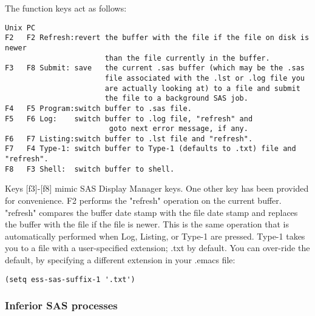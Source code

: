 \documentclass{article}
\begin{document}

The function keys act as follows:
\begin{verbatim}
Unix PC
F2   F2 Refresh:revert the buffer with the file if the file on disk is newer
                       than the file currently in the buffer.
F3   F8 Submit: save   the current .sas buffer (which may be the .sas
                       file associated with the .lst or .log file you
                       are actually looking at) to a file and submit
                       the file to a background SAS job.
F4   F5 Program:switch buffer to .sas file.
F5   F6 Log:    switch buffer to .log file, "refresh" and 
                        goto next error message, if any.
F6   F7 Listing:switch buffer to .lst file and "refresh".
F7   F4 Type-1: switch buffer to Type-1 (defaults to .txt) file and "refresh".
F8   F3 Shell:  switch buffer to shell.
\end{verbatim}

Keys [f3]-[f8] mimic SAS Display Manager keys.  One other key has been
provided for convenience.  F2 performs the "refresh" operation on the
current buffer.  "refresh" compares the buffer date stamp with the
file date stamp and replaces the buffer with the file if the file is
newer.  This is the same operation that is automatically performed
when Log, Listing, or Type-1 are pressed.  Type-1 takes you to a file
with a user-specified extension; .txt by default.  You can over-ride
the default, by specifying a different extension in your .emacs file:
\begin{verbatim}
(setq ess-sas-suffix-1 '.txt')
\end{verbatim}

\subsubsection{Inferior SAS processes}
\label{sec:SAS:proc}
\end{document}
